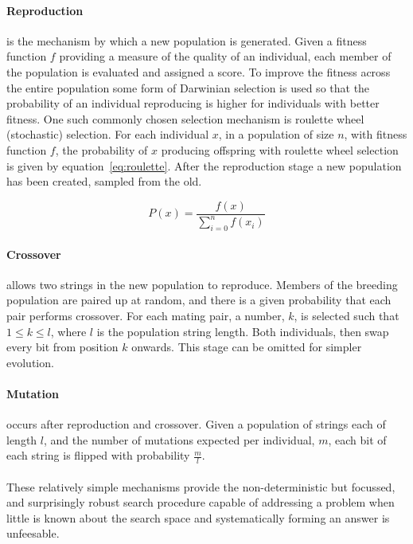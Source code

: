 \paragraph{Reproduction}
is the mechanism by which a new population is generated. Given a fitness function
$f$ providing a measure of the quality of an individual, each member of the
population is evaluated and
assigned a score. To improve the fitness across the entire population some form
of Darwinian selection is used so that the probability of an individual
reproducing is higher for individuals with better fitness.
One such commonly chosen selection mechanism is roulette wheel (stochastic) selection.
For each individual $x$, in a population of size $n$, with fitness function $f$,
the probability of $x$ producing offspring with roulette wheel
selection is given by equation~\ref{eq:roulette}. After the reproduction
stage a new population has been created, sampled from the old.

\begin{equation}
	P(x) = \frac{f(x)}{\sum_{i=0}^{n}f(x_{i})}
	\label{eq:roulette}
\end{equation}

\paragraph{Crossover}
allows two strings in the new population to reproduce. Members of the breeding
population are paired up at random, and there is a given probability that each
pair performs crossover. For each mating pair, a number, $k$,
is selected such that $1 \leq k \leq l$, where $l$ is the population string length.
Both individuals, then swap every bit from position $k$ onwards. This stage can be
omitted for simpler evolution.

\paragraph{Mutation}
occurs after reproduction and crossover. Given a population of strings each of length
$l$, and the number of mutations expected per individual, $m$, each bit of each string
is flipped with probability $\frac{m}{l}$.

\paragraph{}
These relatively simple mechanisms provide the non-deterministic but focussed,
and surprisingly robust search procedure capable of addressing a problem when
little is known about the search space and systematically forming an answer is
unfeesable.

